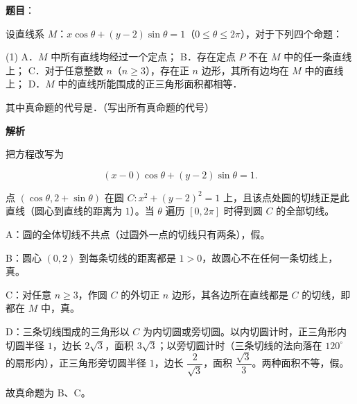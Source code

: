 \begin{answer}

\textbf{题目}：

设直线系 $M$：$x\cos\theta+(y-2)\sin\theta=1$（$0\leqslant\theta\leqslant2\pi$），对于下列四个命题：

\begin{gkopts}(1)
\task A．$M$ 中所有直线均经过一个定点；
\task B．存在定点 $P$ 不在 $M$ 中的任一条直线上；
\task C．对于任意整数 $n$（$n\geqslant3$），存在正 $n$ 边形，其所有边均在 $M$ 中的直线上；
\task D．$M$ 中的直线所能围成的正三角形面积都相等．
\end{gkopts}

其中真命题的代号是\gkblank{}．（写出所有真命题的代号）

\textbf{解析}

把方程改写为

\nopagebreak[4]
\[(x-0)\cos\theta+(y-2)\sin\theta=1.\]

点 $(\cos\theta,2+\sin\theta)$ 在圆 $C:x^2+(y-2)^2=1$ 上，且该点处圆的切线正是此直线（圆心到直线的距离为 $1$）。当 $\theta$ 遍历 $[0,2\pi]$ 时得到圆 $C$ 的全部切线。

A：圆的全体切线不共点（过圆外一点的切线只有两条），假。

B：圆心 $(0,2)$ 到每条切线的距离都是 $1>0$，故圆心不在任何一条切线上，真。

C：对任意 $n\geqslant3$，作圆 $C$ 的外切正 $n$ 边形，其各边所在直线都是 $C$ 的切线，即都在 $M$ 中，真。

D：三条切线围成的三角形以 $C$ 为内切圆或旁切圆。以内切圆计时，正三角形内切圆半径 $1$，边长 $2\sqrt3$，面积 $3\sqrt3$；以旁切圆计时（三条切线的法向落在 $120^\circ$ 的扇形内），正三角形旁切圆半径 $1$，边长 $\dfrac2{\sqrt3}$，面积 $\dfrac{\sqrt3}{3}$。两种面积不等，假。

故真命题为 B、C。


\end{answer}
